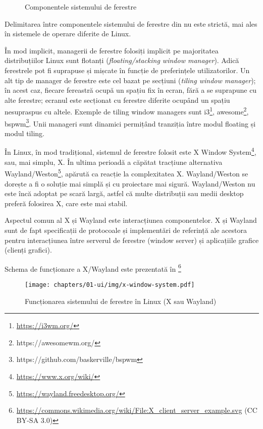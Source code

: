 \begin{figure}[htbp]
  \centering
  \def\svgwidth{\columnwidth}
  
  \caption{Componentele sistemului de ferestre}
  \label{fig:ui:window-system}
\end{figure}

Delimitarea între componentele sistemului de ferestre din  nu este strictă, mai ales în sistemele de operare diferite de Linux.

În mod implicit, managerii de ferestre folosiți implicit pe majoritatea distribuțiilor Linux sunt flotanți (\textit{floating/stacking window manager}).
Adică ferestrele pot fi suprapuse și mișcate în funcție de preferințele utilizatorilor.
Un alt tip de manager de ferestre este cel bazat pe secțiuni (\textit{tiling window manager});
în acest caz, fiecare fereastră ocupă un spațiu fix în ecran, fără a se suprapune cu alte ferestre;
ecranul este secționat cu ferestre diferite ocupând un spațiu nesupraspus cu altele.
Exemple de tiling window managers sunt i3\footnote{\url{https://i3wm.org/}}, awesome\footnote{https://awesomewm.org/}, bspwm\footnote{https://github.com/baskerville/bspwm}.
Unii manageri sunt dinamici permițând tranziția între modul floating și modul tiling.

În Linux, în mod tradițional, sistemul de ferestre folosit este X Window System\footnote{\url{https://www.x.org/wiki/}}, sau, mai simplu, X.
În ultima perioadă a căpătat tracțiune alternativa Wayland/Weston\footnote{\url{https://wayland.freedesktop.org/}}, apărută ca reacție la complexitatea X.
Wayland/Weston se dorește a fi o soluție mai simplă și cu proiectare mai sigură.
Wayland/Weston nu este încă adoptat pe scară largă, astfel că multe distribuții sau medii desktop preferă folosirea X, care este mai stabil.

Aspectul comun al X și Wayland este interacțiunea componentelor.
X și Wayland sunt de fapt specificații de protocoale și implementări de referință ale acestora pentru interacțiunea între serverul de ferestre (window server) și aplicațiile grafice (clienți grafici).

Schema de funcționare a X/Wayland este prezentată în \footnote{\url{https://commons.wikimedia.org/wiki/File:X_client_server_example.svg} (CC BY-SA 3.0)}

\begin{figure}[htbp]
  \centering
  \texttt{[image: chapters/01-ui/img/x-window-system.pdf]}
  \caption{Funcționarea sistemului de ferestre în Linux (X sau Wayland)}
  \label{fig:ui:x-window-system}
\end{figure}

